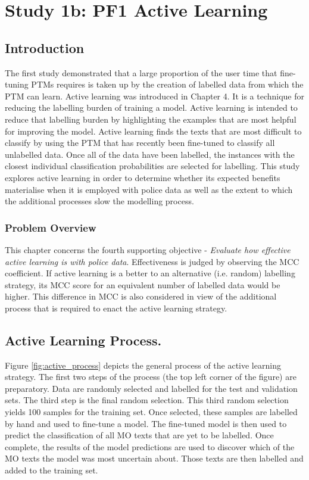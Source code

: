 \chapter{Study 1b: PF1 Active Learning}


\section{Introduction} The first study demonstrated that a large proportion of the user time that fine-tuning PTMs requires is taken up by the creation of labelled data from which the PTM can learn. Active learning was introduced in Chapter 4. It is a technique for reducing the labelling burden of training a model. Active learning is intended to reduce that labelling burden by highlighting the examples that are most helpful for improving the model. Active learning finds the texts that are most difficult to classify by using the PTM that has recently been fine-tuned to classify all unlabelled data. Once all of the data have been labelled, the instances with the closest individual classification probabilities are selected for labelling. This study explores active learning in order to determine whether its expected benefits materialise when it is employed with police data as well as the extent to which the additional processes slow the modelling process.

\subsection{Problem Overview}

This chapter concerns the fourth supporting objective - \emph{Evaluate how effective active learning is with police data}.  Effectiveness is judged by observing the MCC coefficient. If active learning is a better to an alternative (i.e. random) labelling strategy, its MCC score for an equivalent number of labelled data would be higher. This difference in MCC is also considered in view of the additional process that is required to enact the active learning strategy.

\section{Active Learning Process.} Figure \ref{fig:active_process} depicts the general process of the active learning strategy. The first two steps of the process (the top left corner of the figure) are preparatory. Data are randomly selected and labelled for the test and validation sets. The third step is the final random selection. This third random selection yields 100 samples for the training set. Once selected, these samples are labelled by hand and used to fine-tune a model. The fine-tuned model is then used to predict the classification of all MO texts that are yet to be labelled. Once complete, the results of the model predictions are used to discover which of the MO texts the model was most uncertain about. Those texts are then labelled and added to the training set.


